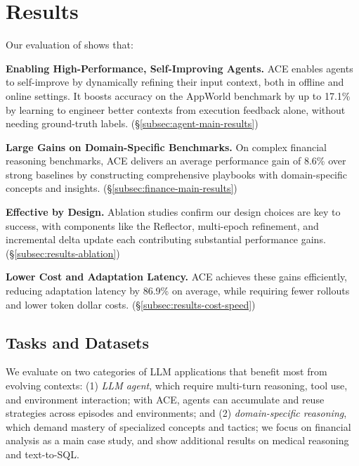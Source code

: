 \section{Results}

Our evaluation of \name shows that:
\begin{packeditemize}
    \item \textbf{Enabling High-Performance, Self-Improving Agents.} ACE enables agents to self-improve by dynamically refining their input context, both in offline and online settings. It boosts accuracy on the AppWorld benchmark by up to 17.1\% by learning to engineer better contexts from execution feedback alone, without needing ground-truth labels. (\S\ref{subsec:agent-main-results})
    \item \textbf{Large Gains on Domain-Specific Benchmarks.} On complex financial reasoning benchmarks, ACE delivers an average performance gain of 8.6\% over strong baselines by constructing comprehensive playbooks with domain-specific concepts and insights. (\S\ref{subsec:finance-main-results})
    \item \textbf{Effective by Design.} Ablation studies confirm our design choices are key to success, with components like the Reflector, multi-epoch refinement, and incremental delta update each contributing substantial performance gains. (\S\ref{subsec:results-ablation})
    \item \textbf{Lower Cost and Adaptation Latency.} ACE achieves these gains efficiently, reducing adaptation latency by 86.9\% on average, while requiring fewer rollouts and lower token dollar costs. (\S\ref{subsec:results-cost-speed})
\end{packeditemize}

\subsection{Tasks and Datasets}

We evaluate \name on two categories of LLM applications that benefit most from evolving contexts: 
(1) \emph{LLM agent}, which require multi-turn reasoning, tool use, and environment interaction; with ACE, agents can accumulate and reuse strategies across episodes and environments; and  
(2) \emph{domain-specific reasoning}, which demand mastery of specialized concepts and tactics; we focus on financial analysis as a main case study, and show additional results on medical reasoning and text-to-SQL. 

